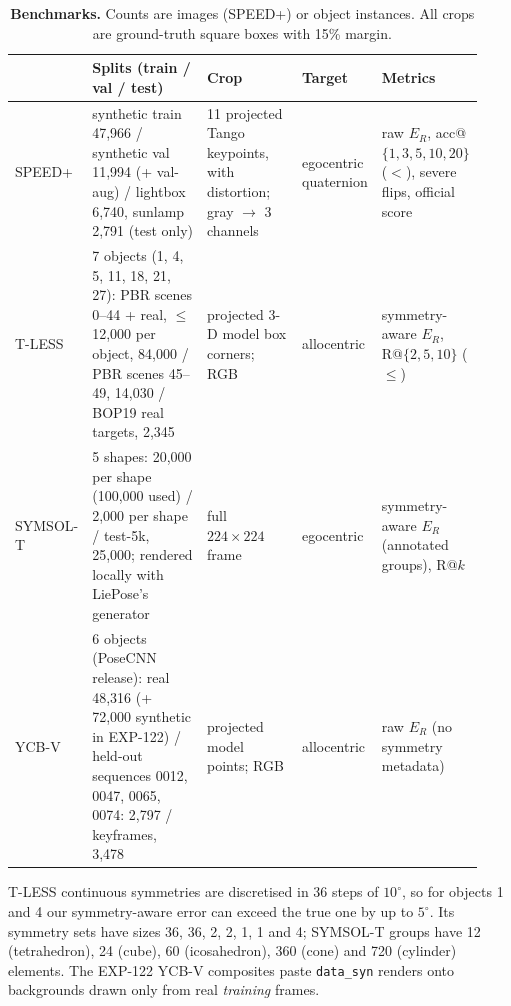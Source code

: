 \begin{table}[t]
  \centering\footnotesize
  \setlength{\tabcolsep}{3pt}
  \caption{\textbf{Benchmarks.} Counts are images (SPEED+) or object instances. All crops are ground-truth square boxes with 15\% margin.}
  \label{app:z_tab_data}
  \begin{tabular}{@{}p{0.09\linewidth}p{0.26\linewidth}p{0.21\linewidth}p{0.17\linewidth}p{0.2\linewidth}@{}}
    \toprule
    \raggedright  & \raggedright Splits (train / val / test) & \raggedright Crop & \raggedright Target & \raggedright Metrics\tabularnewline
    \midrule
    \raggedright SPEED+ & \raggedright synthetic train 47,966 / synthetic val 11,994 (+ val-aug) / lightbox 6,740, sunlamp 2,791 (test only) & \raggedright 11 projected Tango keypoints, with distortion; gray $\to$ 3 channels & \raggedright egocentric quaternion & \raggedright raw $E_R$, acc@$\{1,3,5,10,20\}$ ($<$), severe flips, official score\tabularnewline
    \raggedright T-LESS & \raggedright 7 objects (1, 4, 5, 11, 18, 21, 27): PBR scenes 0--44 + real, $\le$12,000 per object, 84,000 / PBR scenes 45--49, 14,030 / BOP19 real targets, 2,345 & \raggedright projected 3-D model box corners; RGB & \raggedright allocentric & \raggedright symmetry-aware $E_R$, R@$\{2,5,10\}$ ($\le$)\tabularnewline
    \raggedright SYMSOL-T & \raggedright 5 shapes: 20,000 per shape (100,000 used) / 2,000 per shape / test-5k, 25,000; rendered locally with LiePose's generator & \raggedright full $224\times224$ frame & \raggedright egocentric & \raggedright symmetry-aware $E_R$ (annotated groups), R@$k$\tabularnewline
    \raggedright YCB-V & \raggedright 6 objects (PoseCNN release): real 48,316 (+ 72,000 synthetic in EXP-122) / held-out sequences 0012, 0047, 0065, 0074: 2,797 / keyframes, 3,478 & \raggedright projected model points; RGB & \raggedright allocentric & \raggedright raw $E_R$ (no symmetry metadata)\tabularnewline
    \bottomrule
  \end{tabular}
\end{table}

T-LESS continuous symmetries are discretised in 36 steps of $10^\circ$, so for objects 1 and 4 our symmetry-aware error can exceed the true one by up to $5^\circ$. Its symmetry sets have sizes 36, 36, 2, 2, 1, 1 and 4; SYMSOL-T groups have 12 (tetrahedron), 24 (cube), 60 (icosahedron), 360 (cone) and 720 (cylinder) elements. The EXP-122 YCB-V composites paste \texttt{data\_syn} renders onto backgrounds drawn only from real \emph{training} frames.

